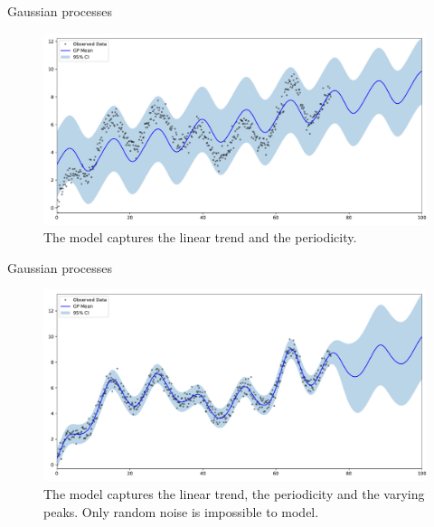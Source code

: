 \documentclass{beamer}
\begin{document}
\begin{frame}{Gaussian processes}
    \begin{figure}
        \centering
        \includegraphics[width=\textwidth]{../Images/EndOfSummerPresentation/TSPredDemoLinearPeriodic.pdf}
        \caption{The model captures the linear trend and the periodicity.}
    \end{figure}
\end{frame}

\begin{frame}{Gaussian processes}
    \begin{figure}
        \centering
        \includegraphics[width=\textwidth]{../Images/EndOfSummerPresentation/TSPredDemoLinearPeriodicRBF.pdf}
        \caption{The model captures the linear trend, the periodicity and the varying peaks. Only random noise is impossible to model.}
    \end{figure}
\end{frame}
\end{document}
